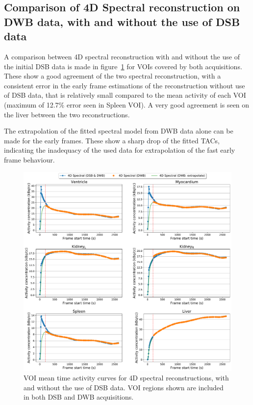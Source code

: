 \subsection{Comparison of 4D Spectral reconstruction on DWB data, with and without the use of DSB data}
A comparison between 4D spectral reconstruction with and without the use of the initial DSB data is made in figure~\ref{fig_3_3:IsotoPK_CTRL_DWB_4D_vs_4D_Central} for VOIs covered by both acquisitions. These show a good agreement of the two spectral reconstruction, with a consistent error in the early frame estimations of the reconstruction without use of DSB data, that is relatively small compared to the mean activity of each VOI (maximum of 12.7\% error seen in Spleen VOI). A very good agreement is seen on the liver between the two reconstructions.

The extrapolation of the fitted spectral model from DWB data alone can be made for the early frames. These show a sharp drop of the fitted TACs, indicating the inadequacy of the used data for extrapolation of the fast early frame behaviour. 

\begin{figure} [h!]
\centering
\includegraphics[scale=0.5,angle=0]{3_Results/3_3_DWB_Reconstruction/figures/3_3_IsotoPK_CTRL_DWB_4D_vs_4D_central.pdf}
\caption{VOI mean time activity curves for 4D spectral reconstructions, with and without the use of DSB data. VOI regions shown are included in both DSB and DWB acquisitions.}
\label{fig_3_3:IsotoPK_CTRL_DWB_4D_vs_4D_Central}
\end{figure} 

